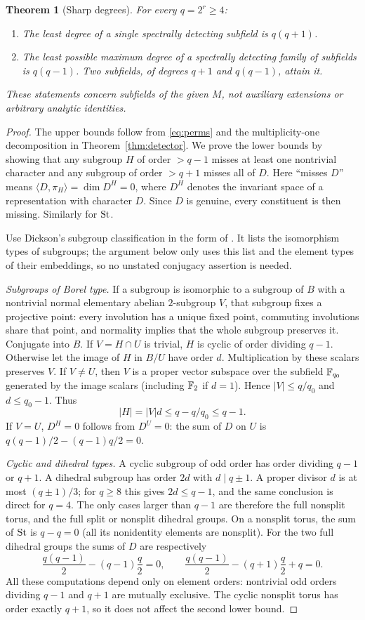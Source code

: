 \documentclass[11pt]{article}
\newtheorem{theorem}{Theorem}[section]
\theoremstyle{remark}\newtheorem{remark}[theorem]{Remark}
\begin{document}
\begin{theorem}[Sharp degrees]\label{thm:optimal}
For every $q=2^r\ge4$:
\begin{enumerate}
\item The least degree of a single spectrally detecting subfield is $q(q+1)$.
\item The least possible maximum degree of a spectrally detecting family of subfields is $q(q-1)$. Two subfields, of degrees $q+1$ and $q(q-1)$, attain it.
\end{enumerate}
These statements concern subfields of the given $M$, not auxiliary extensions or arbitrary analytic identities.
\end{theorem}
\begin{proof}
The upper bounds follow from \eqref{eq:perms} and the multiplicity-one decomposition in Theorem~\ref{thm:detector}. We prove the lower bounds by showing that any subgroup $H$ of order $>q-1$ misses at least one nontrivial character and any subgroup of order $>q+1$ misses all of $D$. Here ``misses $D$'' means $\langle D,\pi_H\rangle=\dim D^H=0$, where $D^H$ denotes the invariant space of a representation with character $D$. Since $D$ is genuine, every constituent is then missing. Similarly for $\mathrm{St}$.

Use Dickson's subgroup classification in the form of \cite[Theorem A.1, p.~1354]{dickson}. It lists the isomorphism types of subgroups; the argument below only uses this list and the element types of their embeddings, so no unstated conjugacy assertion is needed.

\emph{Subgroups of Borel type.} If a subgroup is isomorphic to a subgroup of $B$ with a nontrivial normal elementary abelian $2$-subgroup $V$, that subgroup fixes a projective point: every involution has a unique fixed point, commuting involutions share that point, and normality implies that the whole subgroup preserves it. Conjugate into $B$. If $V=H\cap U$ is trivial, $H$ is cyclic of order dividing $q-1$. Otherwise let the image of $H$ in $B/U$ have order $d$. Multiplication by these scalars preserves $V$. If $V\ne U$, then $V$ is a proper vector subspace over the subfield $\mathbb F_{q_0}$ generated by the image scalars (including $\mathbb F_2$ if $d=1$). Hence $|V|\le q/q_0$ and $d\le q_0-1$. Thus
\[
 |H|=|V|d\le q-q/q_0\le q-1.
\]
If $V=U$, $D^H=0$ follows from $D^U=0$: the sum of $D$ on $U$ is $q(q-1)/2-(q-1)q/2=0$.

\emph{Cyclic and dihedral types.} A cyclic subgroup of odd order has order dividing $q-1$ or $q+1$. A dihedral subgroup has order $2d$ with $d\mid q\pm1$. A proper divisor $d$ is at most $(q\pm1)/3$; for $q\ge8$ this gives $2d\le q-1$, and the same conclusion is direct for $q=4$. The only cases larger than $q-1$ are therefore the full nonsplit torus, and the full split or nonsplit dihedral groups. On a nonsplit torus, the sum of $\mathrm{St}$ is $q-q=0$ (all its nonidentity elements are nonsplit). For the two full dihedral groups the sums of $D$ are respectively
\[
 \frac{q(q-1)}2-(q-1)\frac q2=0,
 \qquad \frac{q(q-1)}2-(q+1)\frac q2+q=0.
\]
All these computations depend only on element orders: nontrivial odd orders dividing $q-1$ and $q+1$ are mutually exclusive. The cyclic nonsplit torus has order exactly $q+1$, so it does not affect the second lower bound.


\end{proof}
\end{document}
